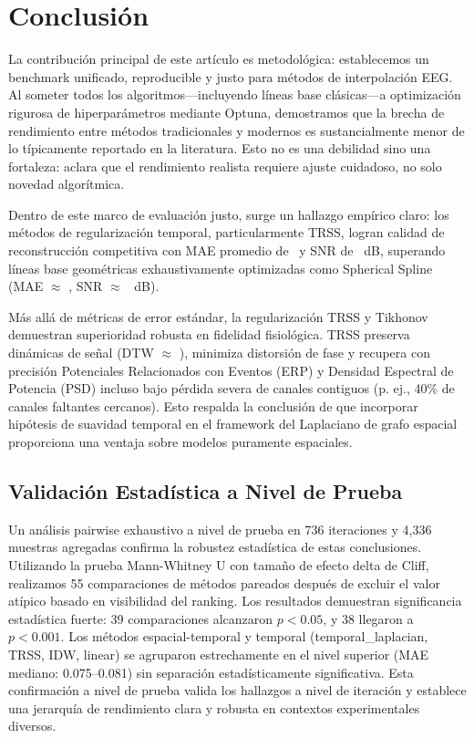 \section{Conclusión}

La contribución principal de este artículo es metodológica: establecemos un benchmark unificado, reproducible y justo para métodos de interpolación EEG. Al someter todos los algoritmos---incluyendo líneas base clásicas---a optimización rigurosa de hiperparámetros mediante Optuna, demostramos que la brecha de rendimiento entre métodos tradicionales y modernos es sustancialmente menor de lo típicamente reportado en la literatura. Esto no es una debilidad sino una fortaleza: aclara que el rendimiento realista requiere ajuste cuidadoso, no solo novedad algorítmica.

Dentro de este marco de evaluación justo, surge un hallazgo empírico claro: los métodos de regularización temporal, particularmente TRSS, logran calidad de reconstrucción competitiva con MAE promedio de \ResTVMAE\ y SNR de \ResTVSNR~dB, superando líneas base geométricas exhaustivamente optimizadas como Spherical Spline (MAE $\approx$ \ResBaselineMAE, SNR $\approx$ \ResBaselineSNR~dB).

Más allá de métricas de error estándar, la regularización TRSS y Tikhonov demuestran superioridad robusta en fidelidad fisiológica. TRSS preserva dinámicas de señal (DTW $\approx$ \ResTVDTW), minimiza distorsión de fase y recupera con precisión Potenciales Relacionados con Eventos (ERP) y Densidad Espectral de Potencia (PSD) incluso bajo pérdida severa de canales contiguos (p. ej., 40\% de canales faltantes cercanos). Esto respalda la conclusión de que incorporar hipótesis de suavidad temporal en el framework del Laplaciano de grafo espacial proporciona una ventaja sobre modelos puramente espaciales.

\subsection*{Validación Estadística a Nivel de Prueba}
Un análisis pairwise exhaustivo a nivel de prueba en 736 iteraciones y 4,336 muestras agregadas confirma la robustez estadística de estas conclusiones. Utilizando la prueba Mann-Whitney U con tamaño de efecto delta de Cliff, realizamos 55 comparaciones de métodos pareados después de excluir el valor atípico basado en visibilidad del ranking. Los resultados demuestran significancia estadística fuerte: 39 comparaciones alcanzaron $p < 0.05$, y 38 llegaron a $p < 0.001$. Los métodos espacial-temporal y temporal (temporal\_laplacian, TRSS, IDW, linear) se agruparon estrechamente en el nivel superior (MAE mediano: 0.075--0.081) sin separación estadísticamente significativa. Esta confirmación a nivel de prueba valida los hallazgos a nivel de iteración y establece una jerarquía de rendimiento clara y robusta en contextos experimentales diversos.

